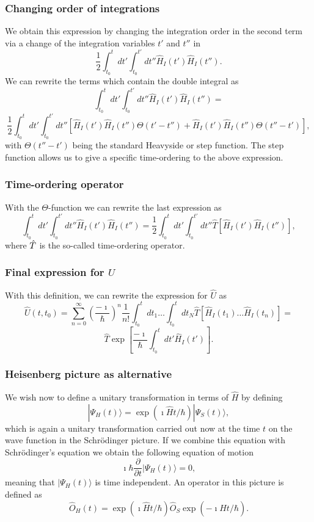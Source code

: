 \documentclass{beamer}
\begin{document}
\begin{frame}
\frametitle{Changing order of integrations}

We obtain this expression by changing the integration order in the second term
via a change of the integration variables $t'$ and $t''$  in 
\[
\frac{1}{2}\int_{t_0}^t dt'\int_{t_0}^{t'} dt'' \hat{H}_I(t')\hat{H}_I(t'').
\]
We can rewrite the terms which contain the double integral as
\[
\int_{t_0}^t dt'\int_{t_0}^{t'} dt'' \hat{H}_I(t')\hat{H}_I(t'')=
\]
\[
\frac{1}{2}\int_{t_0}^t dt'\int_{t_0}^{t'} dt''\left[\hat{H}_I(t')\hat{H}_I(t'')\Theta(t'-t'')
+\hat{H}_I(t')\hat{H}_I(t'')\Theta(t''-t')\right],
\]
with $\Theta(t''-t')$ being the standard Heavyside or step function. The step function allows us to give a specific time-ordering to the above expression.
\end{frame}

\begin{frame}
\frametitle{Time-ordering operator}

With the $\Theta$-function we can rewrite the last expression as 
\[
\int_{t_0}^t dt'\int_{t_0}^{t'} dt'' \hat{H}_I(t')\hat{H}_I(t'')=
\frac{1}{2}\int_{t_0}^t dt'\int_{t_0}^{t'} dt''\hat{T}\left[\hat{H}_I(t')\hat{H}_I(t'')\right],
\]
where $\Hat{T}$ is the so-called time-ordering operator.
\end{frame}

\begin{frame}
\frametitle{Final expression for $U$}

With this definition, we can rewrite the expression for $\hat{U}$ as 
\[
\hat{U}(t,t_0)=\sum_{n=0}^{\infty}\left(\frac{-\imath}{\hbar}\right)^n\frac{1}{n!}
\int_{t_0}^t dt_1\dots \int_{t_0}^t dt_N \hat{T}\left[\hat{H}_I(t_1)\dots\hat{H}_I(t_n)\right]=
\]
\[
\hat{T}\exp{\left[\frac{-\imath}{\hbar}
\int_{t_0}^t dt' \hat{H}_I(t')\right]}.
\]
\end{frame}

\begin{frame}
\frametitle{Heisenberg  picture as alternative}

We wish now to define a unitary transformation in terms of $\hat{H}$ by defining
\[
|\Psi_H(t)\rangle = \exp{(\imath\hat{H}t/\hbar)}|\Psi_S(t)\rangle,
\]
which is again a unitary transformation carried out now at the time $t$ on the 
wave function in the Schrödinger picture. If we combine this equation with 
Schrödinger's equation we obtain the following equation of motion
\[
\imath \hbar\frac{\partial }{\partial t}|\Psi_H(t)\rangle = 0,
\]
meaning that $|\Psi_H(t)\rangle$ is time independent. An operator in this picture is defined as
\[
\hat{O}_H(t)=
\exp{(\imath\hat{H}t/\hbar)}\hat{O}_S\exp{(-\imath\hat{H}t/\hbar)}.
\]
\end{frame}
\end{document}
